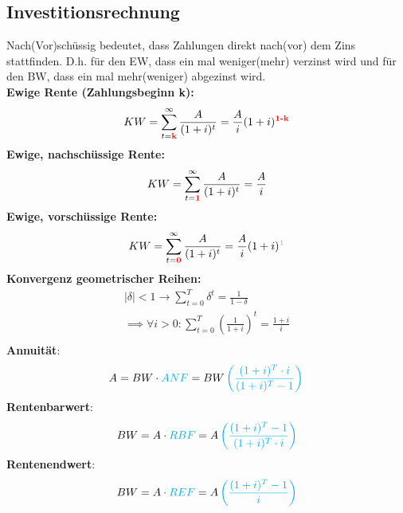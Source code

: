 \documentclass[leqno]{scrartcl}
\begin{document}
\begin{multicols}{4}
\subsection{Investitionsrechnung}

Nach(Vor)schüssig bedeutet, dass Zahlungen direkt nach(vor) dem Zins 
stattfinden. D.h. für den EW, dass ein mal weniger(mehr) verzinst wird und für 
den BW, dass ein mal mehr(weniger) abgezinst wird.\\
\textbf{Ewige Rente (Zahlungsbeginn k):}
  \begin{equation*}
    KW = \sum^{\infty}_{t=\color{red}{\textbf{k}}}\frac{A}{(1+i)^t}=\frac{A}{i}(1+i)^{\color{red}{\textbf{1-k}}}
  \end{equation*}
\textbf{Ewige, nachschüssige Rente:}
  \begin{equation*}
    KW = \sum^{\infty}_{t=\color{red}{\textbf{1}}}\frac{A}{(1+i)^t}=\frac{A}{i}
  \end{equation*}
\textbf{Ewige, vorschüssige  Rente:}
  \begin{equation*}
    KW = \sum^{\infty}_{t=\color{red}{\textbf{0}}}\frac{A}{(1+i)^t}=\frac{A}{i}(1+i)^{\color{lightgray}{\textbf{1}}}
  \end{equation*}
\textbf{Konvergenz geometrischer Reihen:}
  \begin{equation*}\label{convergence}
    \begin{split}
    |\delta|<1 \rightarrow \sum^T_{t=0}\delta^t=\frac{1}{1-\delta}\\
    \implies \forall i > 0 : \sum^T_{t=0}\left(\frac{1}{1+i}\right)^t  = \frac{1+i}{i}\\
    \end{split}
  \end{equation*}
\textbf{Annuität}:\\
  \begin{equation*}
    A = BW \cdot \color{cyan}ANF\color{black} = BW \color{cyan}\left(\frac{(1+i)^T \cdot i}{(1+i)^T-1}\right)\\
  \end{equation*}
\textbf{Rentenbarwert}:\\
  \begin{equation*}
    BW = A \cdot \color{cyan}RBF\color{black} = A  \color{cyan}\left(\frac{(1+i)^T-1}{(1+i)^T \cdot i}\right)
  \end{equation*}
\textbf{Rentenendwert}:\\
  \begin{equation*}
    BW = A \cdot \color{cyan}REF\color{black} = A  \color{cyan}\left(\frac{(1+i)^T-1}{i}\right)

\end{equation*}
\end{multicols}
\end{document}
